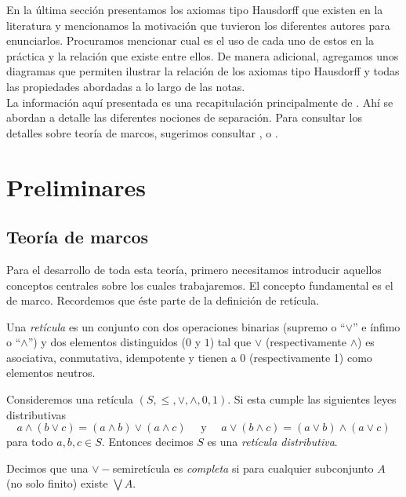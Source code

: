 \documentclass{comunicaciones}
\begin{document}
En la última sección presentamos los axiomas tipo Hausdorff que existen en la literatura y mencionamos la motivación que tuvieron los diferentes autores para enunciarlos. Procuramos mencionar cual es el uso de cada uno de estos en la práctica y la relación que existe entre ellos. De manera adicional, agregamos unos diagramas que permiten ilustrar la relación de los axiomas tipo Hausdorff y todas las propiedades abordadas a lo largo de las notas.\\  

La información aquí presentada es una recapitulación principalmente de \cite{J.P.2}. Ahí se abordan a detalle las diferentes nociones de separación. Para consultar los detalles sobre teoría de marcos, sugerimos consultar \cite{P.T.}, \cite{J.P.} o \cite{A.Z.}. 

\tableofcontents

\section{Preliminares}\label{Preliminares}

\subsection{Teoría de marcos}
Para el desarrollo de toda esta teoría, primero necesitamos introducir aquellos conceptos centrales sobre los cuales trabajaremos. El concepto fundamental es el de marco. Recordemos que éste parte de la definición de retícula.

\begin{dfn}\label{Reticula}
    Una \emph{retícula} es un conjunto con dos operaciones binarias (supremo o ``$\vee$'' e ínfimo o ``$\wedge$'') y dos elementos distinguidos ($0$ y $1$) tal que $\vee$ (respectivamente $\wedge$) es asociativa, conmutativa, idempotente y tienen a $0$ (respectivamente 1) como elementos neutros.
    \end{dfn} 
    
    \begin{dfn}\label{Reticuladistributiva}
    Consideremos una retícula $(S, \leq, \vee, \wedge, 0, 1)$. Si esta  cumple las siguientes leyes distributivas
    \[
    a\wedge (b\vee c)=(a\wedge b)\vee (a\wedge c)\quad\mbox{ y }\quad a\vee (b\wedge c)=(a\vee b)\wedge (a\vee c)
    \]
    para todo $a, b, c\in S$. Entonces decimos $S$ es una \emph{retícula distributiva}.
    \end{dfn}
    
    \begin{dfn}\label{Semiretículacompleta}
    Decimos que una $\vee-$semiretícula es \emph{completa} si para cualquier subconjunto $A$ (no solo finito) existe $\bigvee A$. 
    \end{dfn}
    
\end{document}
